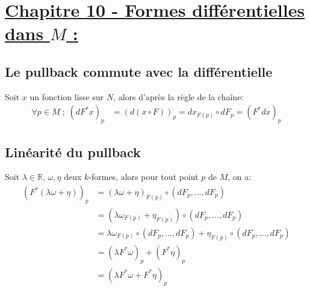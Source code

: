 \section*{\uline{Chapitre 10 - Formes différentielles dans \( M \) {:}}}
      
   \subsection*{Le pullback commute avec la différentielle}
      Soit $x$ un fonction lisse sur $N$, alors d’après la règle de la chaîne:
      \begin{align*}
         \forall p \in M \; ; \; (dF^*x)_p &= (d(x \circ F))_p = dx_{F(p)} \circ dF_p = (F^*dx)_p 
      \end{align*}
   \subsection*{Linéarité du pullback}  
      Soit $\lambda \in \mathbb{R}$, $\omega, \eta$ deux $k$-formes, alors pour tout point $p$ de $M$, on a:
      \begin{align*}
         (F^*(\lambda\omega + \eta))_p &= (\lambda\omega + \eta)_{F(p)} \circ (dF_p, \ldots, dF_p)\\ 
         &=  (\lambda\omega_{F(p)} + \eta_{F(p)}) \circ (dF_p, \ldots, dF_p)\\ 
         &= \lambda\omega_{F(p)} \circ (dF_p, \ldots, dF_p) + \eta_{F(p)} \circ (dF_p, \ldots, dF_p)\\ 
         &= (\lambda F^*\omega)_p + (F^*\eta)_p\\
         &= (\lambda F^*\omega + F^*\eta)_p
      \end{align*}
